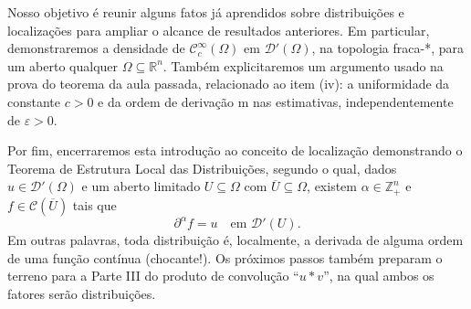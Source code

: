 \documentclass[../distribution_theory_notes.tex]{subfiles}
\begin{document}
Nosso objetivo é reunir alguns fatos já aprendidos sobre distribuições e localizações para ampliar o alcance de resultados anteriores. Em particular, demonstraremos a densidade de \(\mathcal{C}_{c}^{\infty}(\Omega )\) em \(\mathcal{D}'(\Omega )\), na topologia fraca-*, para um aberto qualquer \(\Omega \subseteq \mathbb{R}^{n}\). Também explicitaremos um argumento usado na prova do teorema da aula passada, relacionado ao item (iv): a uniformidade da constante \(c>0\) e da ordem de derivação m nas estimativas, independentemente de \(\varepsilon >0\).

Por fim, encerraremos esta introdução ao conceito de localização demonstrando o Teorema de Estrutura Local das Distribuições, segundo o qual, dados \(u\in \mathcal{D}'(\Omega )\) e um aberto limitado \(U\subseteq \Omega \) com \(\overline{U}\subseteq \Omega \), existem \(\alpha \in \mathbb{Z}_{+}^{n}\) e \(f\in \mathcal{C}(\overline{U})\) tais que
\[
	\partial^{\alpha }f=u\quad\text{em }\mathcal{D}'(U).
\]
Em outras palavras, toda distribuição é, localmente, a derivada de alguma ordem de uma função contínua (chocante!). Os próximos passos também preparam o terreno para a Parte III do produto de convolução ``\(u*v\)'', na qual ambos os fatores serão distribuições.
\end{document}
